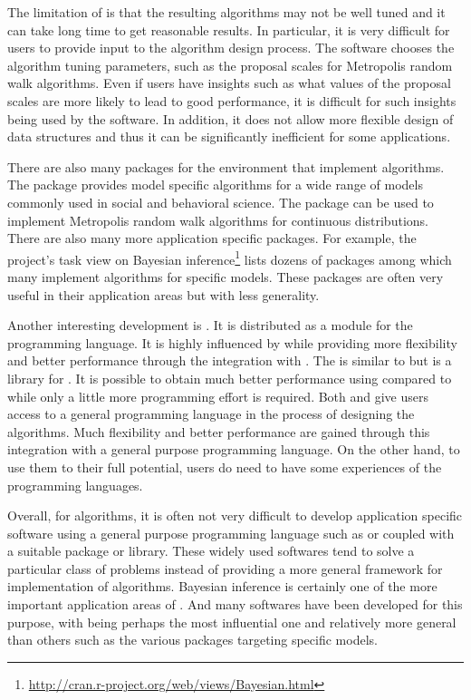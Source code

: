 The limitation of \bugs is that the resulting algorithms may not be well tuned and it can take long time to get reasonable results. In particular, it is very difficult for users to provide input to the algorithm design process. The software chooses the algorithm tuning parameters, such as the proposal scales for Metropolis random walk algorithms. Even if users have insights such as what values of the proposal scales are more likely to lead to good performance, it is difficult for such insights being used by the software. In addition, it does not allow more flexible design of data structures and thus it can be significantly inefficient for some applications.

There are also many packages for the \rlang environment that implement \mcmc algorithms. The \rmcmcpack \cite{rmcmcpack} package provides model specific \mcmc algorithms for a wide range of models commonly used in social and behavioral science. The \rmcmc \cite{rmcmc} package can be used to implement Metropolis random walk algorithms for continuous distributions. There are also many more application specific packages. For example, the \rlang project's task view on Bayesian inference\footnote{\url{http://cran.r-project.org/web/views/Bayesian.html}} lists dozens of packages among which many implement \mcmc algorithms for specific models. These packages are often very useful in their application areas but with less generality.

Another interesting development is \pymc \cite{pymc}. It is distributed as a module for the \python programming language. It is highly influenced by \bugs while providing more flexibility and better performance through the integration with \python. The \cppbugs \cite{cppbugs} is similar to \pymc but is a library for \cpp. It is possible to obtain much better performance using \cppbugs compared to \bugs while only a little more programming effort is required. Both \pymc and \cppbugs give users access to a general programming language in the process of designing the algorithms. Much flexibility and better performance are gained through this integration with a general purpose programming language. On the other hand, to use them to their full potential, users do need to have some experiences of the programming languages.

Overall, for \mcmc algorithms, it is often not very difficult to develop application specific software using a general purpose programming language such as \rlang or \cpp coupled with a suitable package or library. These widely used softwares tend to solve a particular class of problems instead of providing a more general framework for implementation of algorithms. Bayesian inference is certainly one of the more important application areas of \mcmc. And many softwares have been developed for this purpose, with \bugs being perhaps the most influential one and relatively more general than others such as the various \rlang packages targeting specific models.

